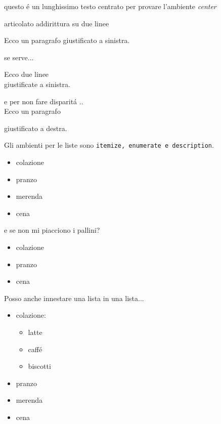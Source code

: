 \documentclass[12pt]{article}
\begin{document}
\bigskip

\begin{center}
questo \'e un lunghissimo testo centrato per provare l'ambiente {\it center}

articolato addirittura su due linee
\end{center}

\bigskip

\begin{flushleft}
Ecco un paragrafo giustificato a sinistra. 

se serve...

Ecco due linee \\
giustificate a sinistra.
\end{flushleft}

\bigskip
\begin{flushright}
e per non fare disparit\'a ..\\
Ecco un paragrafo 

giustificato a destra. 

\end{flushright}
\newpage

Gli ambienti per le {\LARGE liste} sono {\tt itemize, enumerate e description}.

\begin{itemize}
\item colazione 
\item pranzo
\item merenda
\item cena
\end{itemize}

e se non mi piacciono i pallini?
\begin{itemize}
\item[!] colazione
\item[?] pranzo
\item[+] cena
\end{itemize}


Posso anche innestare una lista in una lista...
\begin{itemize}
\item colazione:
	\begin{itemize}
		\item latte 
		\item caff\'e
		\item biscotti
	\end{itemize}
\item pranzo
\item merenda
\item cena
\end{itemize}
 
\end{document}
